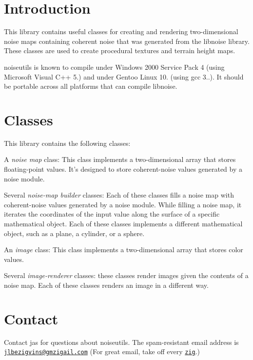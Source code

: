 \hypertarget{index_intro}{}\section{Introduction}\label{index_intro}
This library contains useful classes for creating and rendering two-\/dimensional noise maps containing coherent noise that was generated from the libnoise library. These classes are used to create procedural textures and terrain height maps.

noiseutils is known to compile under Windows 2000 Service Pack 4 (using Microsoft Visual C++ 5.) and under Gentoo Linux 10. (using gcc 3..). It should be portable across all platforms that can compile libnoise.\hypertarget{index_classes}{}\section{Classes}\label{index_classes}
This library contains the following classes\+:
\begin{DoxyItemize}
\item A {\itshape noise map} class\+: This class implements a two-\/dimensional array that stores floating-\/point values. It's designed to store coherent-\/noise values generated by a noise module.
\item Several {\itshape noise-\/map builder} classes\+: Each of these classes fills a noise map with coherent-\/noise values generated by a noise module. While filling a noise map, it iterates the coordinates of the input value along the surface of a specific mathematical object. Each of these classes implements a different mathematical object, such as a plane, a cylinder, or a sphere.
\item An {\itshape image} class\+: This class implements a two-\/dimensional array that stores color values.
\item Several {\itshape image-\/renderer} classes\+: these classes render images given the contents of a noise map. Each of these classes renders an image in a different way.
\end{DoxyItemize}\hypertarget{index_contact}{}\section{Contact}\label{index_contact}
Contact jas for questions about noiseutils. The spam-\/resistant email address is \href{mailto:jlbezigvins@gmzigail.com}{\tt jlbezigvins@gmzigail.\+com} (For great email, take off every \href{http://www.planettribes.com/allyourbase/story.shtml}{\tt zig}.) 